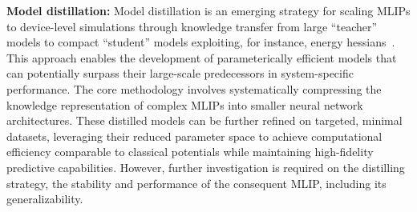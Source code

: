 \textbf{Model distillation:} Model distillation is an emerging strategy for scaling MLIPs to device-level simulations through knowledge transfer from large ``teacher'' models to compact ``student'' models exploiting, for instance, energy hessians~\cite{amin2025towards}. This approach enables the development of parameterically efficient models that can potentially surpass their large-scale predecessors in system-specific performance. The core methodology involves systematically compressing the knowledge representation of complex MLIPs into smaller neural network architectures. These distilled models can be further refined on targeted, minimal datasets, leveraging their reduced parameter space to achieve computational efficiency comparable to classical potentials while maintaining high-fidelity predictive capabilities. However, further investigation is required on the distilling strategy, the stability and performance of the consequent MLIP, including its generalizability. 
